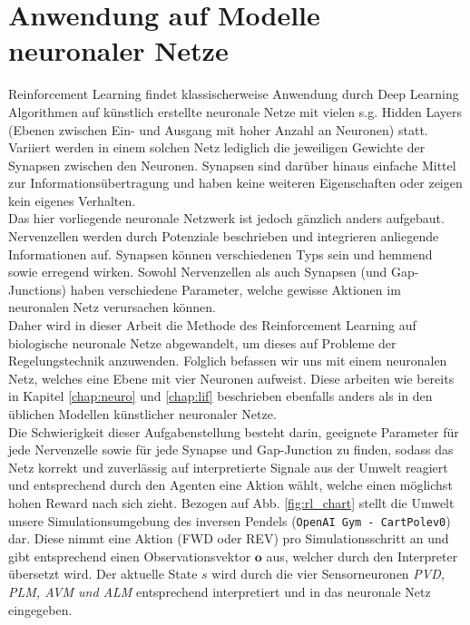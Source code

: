 \section{Anwendung auf Modelle neuronaler Netze}
\label{sec:rl_neuro}
	Reinforcement Learning findet klassischerweise Anwendung durch Deep Learning Algorithmen auf künstlich erstellte neuronale Netze mit vielen s.g. \glqq Hidden Layers\grqq{} (Ebenen zwischen Ein- und Ausgang mit hoher Anzahl an Neuronen) statt. Variiert werden in einem solchen Netz lediglich die jeweiligen Gewichte der Synapsen zwischen den Neuronen. Synapsen sind darüber hinaus einfache Mittel zur Informationsübertragung und haben keine weiteren Eigenschaften oder zeigen kein eigenes Verhalten.\\
	Das hier vorliegende neuronale Netzwerk ist jedoch gänzlich anders aufgebaut. Nervenzellen werden durch Potenziale beschrieben und integrieren anliegende Informationen auf. Synapsen können verschiedenen Typs sein und hemmend sowie erregend wirken. Sowohl Nervenzellen als auch Synapsen (und Gap-Junctions) haben verschiedene Parameter, welche gewisse Aktionen im neuronalen Netz verursachen können.\\
	Daher wird in dieser Arbeit die Methode des Reinforcement Learning auf biologische neuronale Netze abgewandelt, um dieses auf Probleme der Regelungstechnik anzuwenden. Folglich befassen wir uns mit einem neuronalen Netz, welches eine Ebene mit vier Neuronen aufweist. Diese  arbeiten wie bereits in Kapitel \ref{chap:neuro} und \ref{chap:lif} beschrieben ebenfalls anders als in den üblichen Modellen künstlicher neuronaler Netze.\\
	Die Schwierigkeit dieser Aufgabenstellung besteht darin, geeignete Parameter für jede Nervenzelle sowie für jede Synapse und Gap-Junction zu finden, sodass das Netz korrekt und zuverlässig auf interpretierte Signale aus der Umwelt reagiert und entsprechend durch den Agenten eine Aktion wählt, welche einen möglichst hohen Reward nach sich zieht. Bezogen auf Abb. \ref{fig:rl_chart} stellt die Umwelt unsere Simulationsumgebung des inversen Pendels (\texttt{OpenAI Gym - CartPolev0}) dar. Diese nimmt eine Aktion (FWD oder REV) pro Simulationsschritt an und gibt entsprechend einen Observationsvektor $\textbf{o}$ aus, welcher durch den Interpreter übersetzt wird. Der aktuelle State $s$ wird durch die vier Sensorneuronen \textit{PVD, PLM, AVM und ALM} entsprechend interpretiert und in das neuronale Netz eingegeben.

